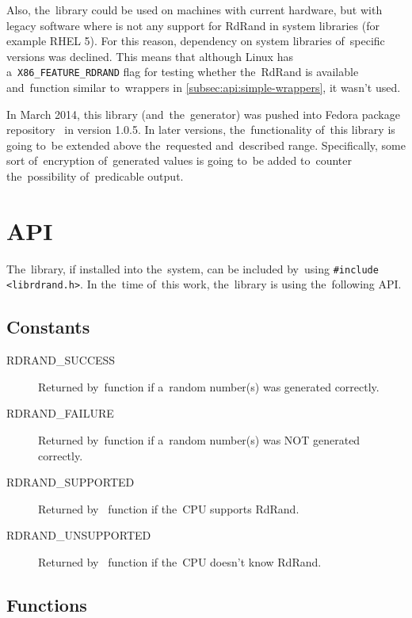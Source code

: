 \par{
Also, the~library could be used on machines with current hardware, but with legacy software where is not any support for RdRand in system libraries (for example RHEL 5). For this reason, dependency on system libraries of~specific versions was declined. This means that although Linux has a~{\tt X86\_FEATURE\_RDRAND} flag for testing whether the~RdRand is available and~function similar to~wrappers in \ref{subsec:api:simple-wrappers}, it wasn't used.
}

\par{
In March 2014, this library (and~the~generator) was pushed into Fedora package repository~\cite{RdRandFedoraPackage,RdRandFedoraPackageBugzilla} in version 1.0.5. 
In later versions, the~functionality of~this library is going to~be extended above the~requested and~described range. Specifically, some sort of~encryption of~generated values is going to~be added to~counter the~possibility of~predicable output.
}


\section{API} \label{sec:library-api}
\par{
The~library, if installed into the~system, can be included by~using {\tt \#include <librdrand.h>}. In the~time of~this work, the~library is using the~following API.
}
\subsection{Constants}
\begin{description}
  \item[RDRAND\_SUCCESS] Returned by~function if a~random number(s) was generated correctly.
  \item[RDRAND\_FAILURE] Returned by~function if a~random number(s) was NOT generated correctly.
  \item[RDRAND\_SUPPORTED] Returned by~ function if the~CPU supports RdRand.
  \item[RDRAND\_UNSUPPORTED] Returned by~ function if the~CPU doesn't know RdRand.
  
\end{description}


\subsection{Functions}


